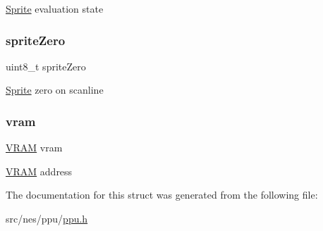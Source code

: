 \hyperlink{struct_sprite}{Sprite} evaluation state \mbox{\label{struct_p_p_u_ab7fdc3f45d8fd245221d2dd1cca96d7d}} 
\subsubsection{\texorpdfstring{sprite\+Zero}{spriteZero}}
{\footnotesize\ttfamily uint8\+\_\+t sprite\+Zero}

\hyperlink{struct_sprite}{Sprite} zero on scanline \mbox{\label{struct_p_p_u_abc329fd3bb95268164f54c040118ab9c}} 
\subsubsection{\texorpdfstring{vram}{vram}}
{\footnotesize\ttfamily \hyperlink{struct_v_r_a_m}{V\+R\+AM} vram}

\hyperlink{struct_v_r_a_m}{V\+R\+AM} address 

The documentation for this struct was generated from the following file\+:\begin{DoxyCompactItemize}
\item 
src/nes/ppu/\hyperlink{ppu_8h}{ppu.\+h}\end{DoxyCompactItemize}
